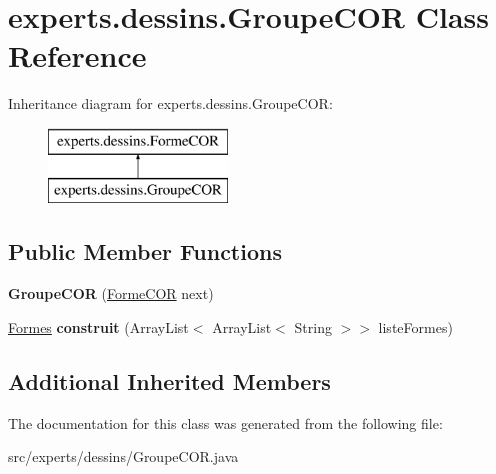 \hypertarget{classexperts_1_1dessins_1_1_groupe_c_o_r}{}\section{experts.\+dessins.\+Groupe\+C\+OR Class Reference}
\label{classexperts_1_1dessins_1_1_groupe_c_o_r}
Inheritance diagram for experts.\+dessins.\+Groupe\+C\+OR\+:\begin{figure}[H]
\begin{center}
\leavevmode
\includegraphics[height=2.000000cm]{classexperts_1_1dessins_1_1_groupe_c_o_r}
\end{center}
\end{figure}
\subsection*{Public Member Functions}
\begin{DoxyCompactItemize}
\item 
\mbox{\label{classexperts_1_1dessins_1_1_groupe_c_o_r_a66efcb1a7a83de03987f1be9b408a0de}} 
{\bfseries Groupe\+C\+OR} (\mbox{\hyperlink{classexperts_1_1dessins_1_1_forme_c_o_r}{Forme\+C\+OR}} next)
\item 
\mbox{\label{classexperts_1_1dessins_1_1_groupe_c_o_r_ad334237854efb2d1780c3be464f29c08}} 
\mbox{\hyperlink{classdessin_1_1_formes}{Formes}} {\bfseries construit} (Array\+List$<$ Array\+List$<$ String $>$$>$ liste\+Formes)
\end{DoxyCompactItemize}
\subsection*{Additional Inherited Members}


The documentation for this class was generated from the following file\+:\begin{DoxyCompactItemize}
\item 
src/experts/dessins/Groupe\+C\+O\+R.\+java\end{DoxyCompactItemize}
